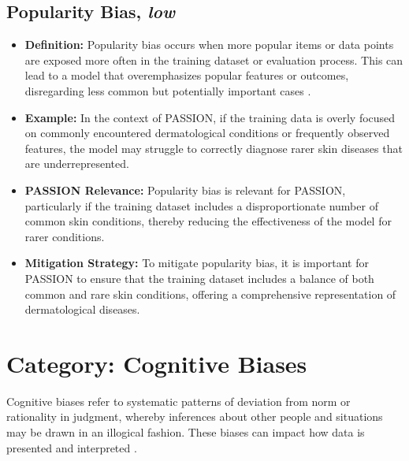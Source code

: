 \begin{refsection}
		\subsection{Popularity Bias, \textit{low}}
		\begin{itemize}
			\item \textbf{Definition:} Popularity bias occurs when more popular items or data points are exposed more often in the training dataset or evaluation process. This can lead to a model that overemphasizes popular features or outcomes, disregarding less common but potentially important cases \autocites{M117_Ciampaglia_2018}{Mehrabi_2021}.
			\item \textbf{Example:} In the context of PASSION, if the training data is overly focused on commonly encountered dermatological conditions or frequently observed features, the model may struggle to correctly diagnose rarer skin diseases that are underrepresented.
			\item \textbf{PASSION Relevance:} Popularity bias is relevant for PASSION, particularly if the training dataset includes a disproportionate number of common skin conditions, thereby reducing the effectiveness of the model for rarer conditions.
			\item \textbf{Mitigation Strategy:} To mitigate popularity bias, it is important for PASSION to ensure that the training dataset includes a balance of both common and rare skin conditions, offering a comprehensive representation of dermatological diseases.
		\end{itemize}
		
		
		
		\section{\textbf{Category:} Cognitive Biases}
		Cognitive biases refer to systematic patterns of deviation from norm or rationality in judgment, whereby inferences about other people and situations may be drawn in an illogical fashion. These biases can impact how data is presented and interpreted \autocite{Mester_2017}.
		

\end{refsection}
